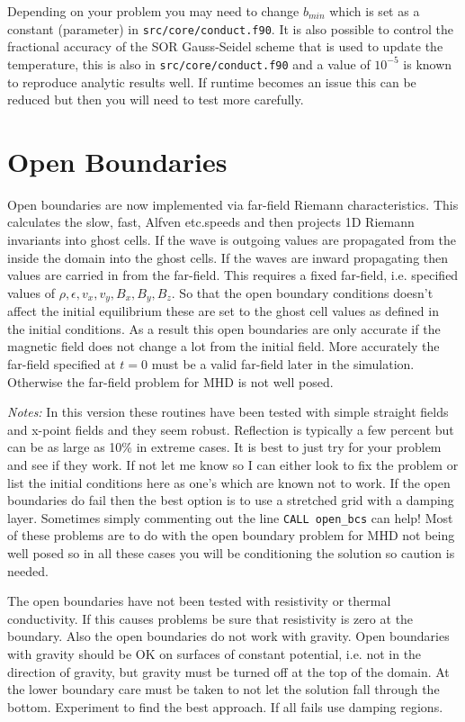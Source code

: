 \documentclass[11pt]{article}
\begin{document}
Depending on your problem you may need to change $b_{min}$ which is set as a constant (parameter) in {\tt src/core/conduct.f90}. It is also possible to control the fractional accuracy of the SOR Gauss-Seidel scheme that is used to update the temperature, this is also in {\tt src/core/conduct.f90} and a value of $10^{-5}$ is known to reproduce analytic results well. If runtime becomes an issue this can be reduced but then you will need to test more carefully.

            
\section{Open  Boundaries} %
\label{sec:open_bcs}
Open boundaries are now implemented via far-field Riemann characteristics. This calculates the slow, fast, Alfven etc.speeds and then projects 1D Riemann invariants into ghost cells. If the wave is outgoing values are propagated from the inside the domain into the ghost cells. If the waves are inward propagating then values are carried in from the far-field. This requires a fixed far-field, i.e. specified values of $\rho, \epsilon, v_x, v_y, B_x, B_y, B_z$. So that the open boundary conditions doesn't affect the initial equilibrium these are set to the ghost cell values as defined in the initial conditions. As a result this open boundaries are only accurate if the magnetic field does not change a lot from the initial field. More accurately the far-field specified at $t=0$ must be a valid far-field later in the simulation. Otherwise the far-field problem for MHD is not well posed.

{\it Notes:} In this version these routines have been tested with simple straight fields and x-point fields and they seem robust. Reflection is typically a few percent but can be as large as 10\% in extreme cases. It is best to just try for your problem and see if they work. If not let me know so I can either look to fix the problem or list the initial conditions here as one's which are known not to work. If the open boundaries do fail then the best option is to use a stretched grid with a damping layer. Sometimes simply commenting out the line {\tt CALL open\_bcs} can help! Most of these problems are to do with the open boundary problem for MHD not being well posed so in all these cases you will be conditioning the solution so caution is needed. 

The open boundaries have not been tested with resistivity or thermal conductivity. If this causes problems be sure that resistivity is zero at the boundary. Also the open boundaries do not work with gravity. Open boundaries with gravity should be OK on surfaces of constant potential, i.e. not in the direction of gravity, but gravity must be turned off at the top of the domain. At the lower boundary care must be taken to not let the solution fall through the bottom. Experiment to find the best approach. If all fails use damping regions.
\end{document}
